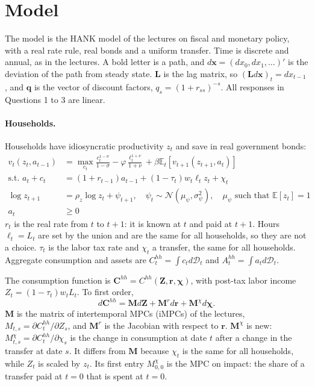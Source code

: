 \section{Model}

The model is the HANK model of the lectures on fiscal and monetary policy, with a real rate rule, real bonds and a uniform transfer. Time is discrete and annual, as in the lectures. A bold letter is a path, and $d\boldsymbol{x}=(dx_0,dx_1,\ldots)'$ is the deviation of the path from steady state. $\boldsymbol{L}$ is the lag matrix, so $(\boldsymbol{L}d\boldsymbol{x})_t=dx_{t-1}$, and $\boldsymbol{q}$ is the vector of discount factors, $q_s=(1+r_{ss})^{-s}$. All responses in Questions 1 to 3 are linear.

\paragraph*{Households.}
Households have idiosyncratic productivity $z_{t}$ and save in real government bonds:
\begin{align*}
v_{t}(z_{t},a_{t-1}) & =\max_{c_{t}}\frac{c_{t}^{1-\sigma}}{1-\sigma}-\varphi\frac{\ell_{t}^{1+\nu}}{1+\nu}+\beta\mathbb{E}_{t}\left[v_{t+1}(z_{t+1},a_{t})\right]\\
\text{s.t. }a_{t}+c_{t} & =(1+r_{t-1})a_{t-1}+(1-\tau_{t})w_{t}\ell_{t}z_{t}+\chi_{t}\\
\log z_{t+1} & =\rho_{z}\log z_{t}+\psi_{t+1},\quad\psi_{t}\sim\mathcal{N}(\mu_{\psi},\sigma_{\psi}^{2}),\quad\mu_{\psi}\text{ such that }\mathbb{E}[z_{t}]=1\\
a_{t} & \geq0
\end{align*}
$r_{t}$ is the real rate from $t$ to $t+1$: it is known at $t$ and paid at $t+1$. Hours $\ell_{t}=L_{t}$ are set by the union and are the same for all households, so they are not a choice. $\tau_{t}$ is the labor tax rate and $\chi_{t}$ a transfer, the same for all households. Aggregate consumption and assets are $C_{t}^{hh}=\int c_{t}d\mathcal{D}_{t}$ and $A_{t}^{hh}=\int a_{t}d\mathcal{D}_{t}$.

The consumption function is $\boldsymbol{C}^{hh}=C^{hh}(\boldsymbol{Z},\boldsymbol{r},\boldsymbol{\chi})$, with post-tax labor income $Z_{t}=(1-\tau_{t})w_{t}L_{t}$. To first order,
\begin{equation}
d\boldsymbol{C}^{hh}=\boldsymbol{M}d\boldsymbol{Z}+\boldsymbol{M}^{r}d\boldsymbol{r}+\boldsymbol{M}^{\chi}d\boldsymbol{\chi}.\label{eq:cons}
\end{equation}
$\boldsymbol{M}$ is the matrix of intertemporal MPCs (iMPCs) of the lectures, $M_{t,s}=\partial C_{t}^{hh}/\partial Z_{s}$, and $\boldsymbol{M}^{r}$ is the Jacobian with respect to $\boldsymbol{r}$. $\boldsymbol{M}^{\chi}$ is new: $M^{\chi}_{t,s}=\partial C_{t}^{hh}/\partial\chi_{s}$ is the change in consumption at date $t$ after a change in the transfer at date $s$. It differs from $\boldsymbol{M}$ because $\chi_{t}$ is the same for all households, while $Z_{t}$ is scaled by $z_{t}$. Its first entry $M^{\chi}_{0,0}$ is the MPC on impact: the share of a transfer paid at $t=0$ that is spent at $t=0$.

